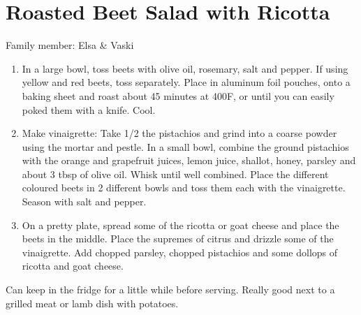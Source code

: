 \chapter{Roasted Beet Salad with Ricotta}
\label{ch:roasted-beet-salad}


Family member: Elsa \& Vaski

\begin{enumerate}
    \item In a large bowl, toss beets with olive oil, rosemary, salt and pepper. If using yellow and red beets, toss separately. Place in aluminum foil pouches, onto a baking sheet and roast about 45 minutes at 400\degree F, or until you can easily poked them with a knife. Cool.
    \item Make vinaigrette: Take 1/2 the pistachios and grind into a coarse powder using the mortar and pestle. In a small bowl, combine the ground pistachios with the orange and grapefruit juices, lemon juice, shallot, honey, parsley and about 3 tbsp of olive oil. Whisk until well combined. Place the different coloured beets in 2 different bowls and toss them each with the vinaigrette. Season with salt and pepper.
    \item On a pretty plate, spread some of the ricotta or goat cheese and place the beets in the middle. Place the supremes of citrus and drizzle some of the vinaigrette. Add chopped parsley, chopped pistachios and some dollops of ricotta and goat cheese.
\end{enumerate}

Can keep in the fridge for a little while before serving.
Really good next to a grilled meat or lamb dish with potatoes.

